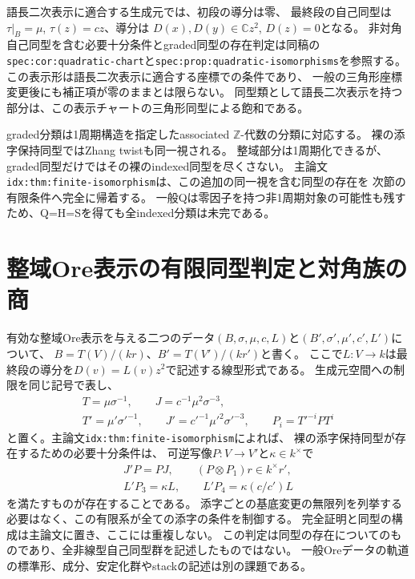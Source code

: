 \documentclass[11pt,a4paper]{ltjsarticle}
\newcommand{\ZZ}{\mathbb Z}
\begin{document}
語長二次表示に適合する生成元では、初段の導分は零、
最終段の自己同型は$\tau|_B=\mu$, $\tau(z)=cz$、導分は
$D(x),D(y)\in\mathbb C z^2$, $D(z)=0$となる。
非対角自己同型を含む必要十分条件とgraded同型の存在判定は同稿の
\texttt{spec:cor:quadratic-chart}と\texttt{spec:prop:quadratic-isomorphisms}を参照する。
この表示形は語長二次表示に適合する座標での条件であり、
一般の三角形座標変更後にも補正項が零のままとは限らない。
同型類として語長二次表示を持つ部分は、この表示チャートの三角形同型による飽和である。

graded分類は1周期構造を指定したassociated $\ZZ$-代数の分類に対応する。
裸の添字保持同型ではZhang twistも同一視される。
整域部分は1周期化できるが、graded同型だけではその裸のindexed同型を尽くさない。
主論文\texttt{idx:thm:finite-isomorphism}は、この追加の同一視を含む同型の存在を
次節の有限条件へ完全に帰着する。
一般Qは零因子を持つ非1周期対象の可能性も残すため、Q=H=Sを得ても全indexed分類は未完である。

\section{整域Ore表示の有限同型判定と対角族の商}
有効な整域Ore表示を与える二つのデータ$(B,\sigma,\mu,c,L)$と$(B',\sigma',\mu',c',L')$について、
$B=T(V)/(kr)$、$B'=T(V')/(kr')$と書く。
ここで$L:V\to k$は最終段の導分を$D(v)=L(v)z^2$で記述する線型形式である。
生成元空間への制限を同じ記号で表し、
\begin{gather*}
T=\mu\sigma^{-1},\qquad J=c^{-1}\mu^2\sigma^{-3},\\
T'=\mu'\sigma'^{-1},\qquad J'=c'^{-1}\mu'^2\sigma'^{-3},\qquad
P_i=T'^{-i}PT^i
\end{gather*}
と置く。主論文\texttt{idx:thm:finite-isomorphism}によれば、
裸の添字保持同型が存在するための必要十分条件は、
可逆写像$P:V\to V'$と$\kappa\in k^\times$で
\[
\begin{gathered}
J'P=PJ,\qquad (P\otimes P_1)r\in k^\times r',\\
L'P_3=\kappa L,\qquad L'P_4=\kappa(c/c')L
\end{gathered}
\]
を満たすものが存在することである。
添字ごとの基底変更の無限列を列挙する必要はなく、この有限系が全ての添字の条件を制御する。
完全証明と同型の構成は主論文に置き、ここには重複しない。
この判定は同型の存在についてのものであり、全非線型自己同型群を記述したものではない。
一般Oreデータの軌道の標準形、成分、安定化群やstackの記述は別の課題である。
\end{document}
